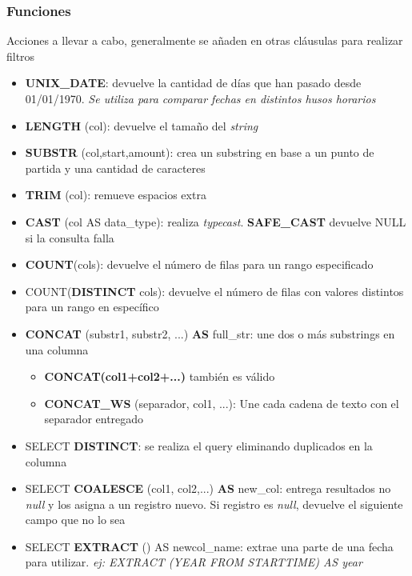 \subsubsection{Funciones}
Acciones a llevar a cabo, generalmente se añaden en otras cláusulas para realizar filtros
\begin{itemize}
    \item {\textbf{UNIX\_DATE}: devuelve la cantidad de días que han pasado desde 01/01/1970. \textit{Se utiliza para comparar fechas en distintos husos horarios}}
    \item {\textbf{LENGTH} (col): devuelve el tamaño del \textit{string}}
    \item {\textbf{SUBSTR} (col,start,amount): crea un substring en base a un punto de partida y una cantidad de caracteres}
    \item {\textbf{TRIM} (col): remueve espacios extra}
    \item {\textbf{CAST} (col AS data\_type): realiza \textit{typecast}. \textbf{SAFE\_CAST} devuelve NULL si la consulta falla}
    \item {\textbf{COUNT}(cols): devuelve el número de filas para un rango especificado}
    \item {COUNT(\textbf{DISTINCT} cols): devuelve el número de filas con valores distintos para un rango en específico}
    \item {\textbf{CONCAT} (substr1, substr2, ...) \textbf{AS} full\_str: une dos o más substrings en una columna
    \begin{itemize}
        \item {\textbf{CONCAT(col1+col2+...)} también es válido}
        \item {\textbf{CONCAT\_WS} (separador, col1, ...): Une cada cadena de texto con el separador entregado}
    \end{itemize}}
    \item {SELECT \textbf{DISTINCT}: se realiza el query eliminando duplicados en la columna}
    \item {SELECT \textbf{COALESCE} (col1, col2,...) \textbf{AS} new\_col: entrega resultados no \textit{null} y los asigna a un registro nuevo. Si registro es \textit{null}, devuelve el siguiente campo que no lo sea}
    \item {SELECT \textbf{EXTRACT} () AS newcol\_name: extrae una parte de una fecha para utilizar. \textit{ej: EXTRACT (YEAR FROM STARTTIME) AS year} }
\end{itemize}


